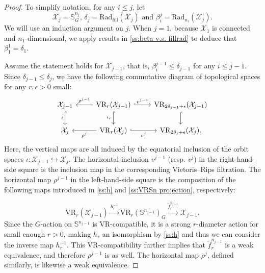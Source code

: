 \documentclass{amsart}
\theoremstyle{definition}
\newcommand{\cX}{\mathcal{X}}
\newcommand{\bS}{\mathbb{S}}
\newcommand{\VR}{\mathrm{VR}}
\theoremstyle{theorem}
\newcommand{\fillrad}{\mathrm{Rad}_{\mathrm{fill}}}
\newcommand{\firstdeath}[2]{\mathrm{Rad}_{#1}(#2)}
\begin{document}
\begin{proof}
	To simplify notation, for any $i \leq j$, let
	\[
	\cX_j = \bS^{n_j}_G, \,\delta_j = \fillrad(\cX_j) \text{ and }\beta_i^j = \firstdeath{n_i}{\cX_j}.
	\]
	We will use an induction argument on $j$.
	When $j = 1$, because $\cX_1$ is connected and $n_1$-dimensional, we apply results in \cref{ss:beta v.s. fillrad} to deduce that $\beta_1^1 = \delta_1$.

	Assume the statement holds for $\cX_{j-1}$, that is, $\beta_i^{j-1} \leq \delta_{j-1}$ for any $i \leq j-1$.
	Since $\delta_{j-1} \leq \delta_j$, we have the following commutative diagram of topological spaces for any $r,\epsilon>0$ small:
	\begin{equation}\label{eq:fundamental_bars_diagram}
		\begin{tikzcd}
			\cX_{j-1}
			\ar[d, hook,"{\iota}" left]
			&
			\VR_r(\cX_{j-1})
			\ar[d, hook,"\iota_r" left]
			\ar[l, "\rho^{j-1}" above]
			\ar[r, hook, "v^{j-1}"]
			&
			\VR_{2\delta_{j-1}+\epsilon}(\cX_{j-1})
			\ar[d, hook]
			\\
			\cX_j
			&
			\VR_r(\cX_j)
			\ar[l, "\rho^j" below]
			\ar[r, hook, "v^j" below]
			&
			\VR_{2\delta_j+\epsilon}(\cX_j).
		\end{tikzcd}
	\end{equation}
	Here, the vertical maps are all induced by the equatorial inclusion of the orbit spaces $\iota \colon \cX_{j-1} \hookrightarrow \cX_j$.
	The horizontal inclusion $v^{j-1}$ (resp. $v^j$) in the right-hand-side square is the inclusion map in the corresponding Vietoris--Rips filtration.
	The horizontal map $\rho^{j-1}$ in the left-hand-side square is the composition of the following maps introduced in \cref{ss:h} and \cref{ss:VRSn projection}, respectively:

	
	\[\VR_r(\cX_{j-1}) \xrightarrow{h^{-1}_r}\VR_r(\bS^{n_{j-1}})_G \xrightarrow{\tilde{f}_r^{n_{j-1}}} \cX_{j-1}.\]
	Since the \(G\)-action on \(\bS^{n_{j-1}}\) is VR-compatible, it is a strong \(r\)-diameter action for small enough $r>0$, making \(h_r\) an isomorphism by \cref{ss:h} and thus we can consider the inverse map $h^{-1}_r$.
	This VR-compatibility further implies that \(\tilde{f}_r^{n_{j-1}}\) is a weak equivalence, and therefore \(\rho^{j-1}\) is as well.
	The horizontal map \(\rho^j\), defined similarly, is likewise a weak equivalence.


\end{proof}
\end{document}
